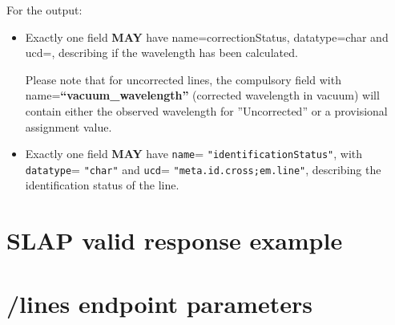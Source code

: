 \documentclass[11pt,a4paper]{ivoa}
\def\attrval#1#2{\texttt{#1}\discretionary{}{}{}=\discretionary{}{}{}%
  \texttt{"#2"}}
\begin{document}
For the output:

\begin{itemize}
\item Exactly one field \textbf{MAY} have name={\textquotedbl}correctionStatus{\textquotedbl}, datatype={\textquotedbl}char{\textquotedbl} and
ucd=, describing if the wavelength has been calculated.

Please note that for uncorrected lines, the compulsory field with name=\textbf{``vacuum\_wavelength''} (corrected wavelength in vacuum)
will contain either the observed wavelength for ''Uncorrected'' or a
provisional assignment value.

\item Exactly one field \textbf{MAY} have \attrval{name}{identificationStatus}, with
\attrval{datatype}{char} and
\attrval{ucd}{meta.id.cross;em.line}, describing the identification status of the line.

\end{itemize}


\section{SLAP valid response example}


\section{/lines endpoint parameters}

\def\headerstrut{\vrule width 0pt height 12pt depth 6pt}
\end{document}
